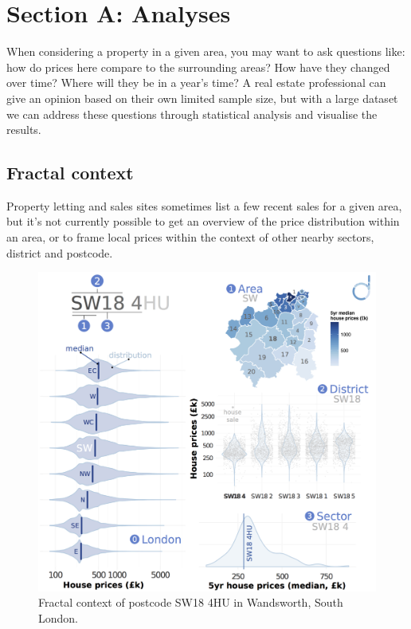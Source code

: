 \documentclass[
10pt, %
a4paper, %
oneside, %
headinclude,footinclude, %
BCOR5mm, %
]{scrartcl}
\begin{document}



\vspace{-1em}
\section*{Section A: Analyses}

When considering a property in a given area, you may want to ask
questions like: how do prices here compare to the surrounding areas?
How have they changed over time? Where will they be in a year's time?
A real estate professional can give an opinion based on their own
limited sample size, but with a large dataset we can address these
questions through statistical analysis and visualise the results.

\vspace{-.5em}
\subsection*{Fractal context}

Property letting and sales sites sometimes list a few recent sales for
a given area, but it's not currently possible to get an overview
of the price distribution within an area, or to frame local prices
within the context of other nearby sectors, district and postcode.

\begin{figure}
\centering
\includegraphics[width=.43\textwidth]{Figures/fractal.png}
\caption{ Fractal context of postcode SW18 4HU in Wandsworth, South London.}
\end{figure}
\end{document}
